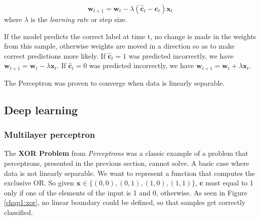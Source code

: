 \documentclass[11pt,english,listoffigures,listoftables]{tfgetsinf}
\newcommand{\vect}[1]{\mathbf{#1}}
\begin{document}
\begin{equation}
    \vect{w}_{t+1}=\vect{w}_t - \lambda(\vect{\hat{c}}_t - \vect{c}_t)\vect{x}_t
\end{equation}
where $\lambda$ is the \textit{learning rate} or step size.

If the model predicts the correct label at time t, no change is made in the weights from this sample, otherwise weights are moved in a direction so as to make correct predictions more likely.
If $\vect{\hat{c}}_t=1$ was predicted incorrectly, we have $\vect{w}_{t+1}=\vect{w}_t - \lambda \vect{x}_t$. 
If $\vect{\hat{c}}_t=0$ was predicted incorrectly, we have $\vect{w}_{t+1}=\vect{w}_t + \lambda \vect{x}_t$. 

The Perceptron was proven to converge when data is linearly separable.



\subsection{Deep learning}\label{dl}



\subsubsection{Multilayer perceptron}
The \textbf{XOR Problem} from \textit{Perceptrons} \cite{minsky69perceptrons}  was a classic example of a problem that perceptrons, presented in the previous section, cannot solve. A basic case where data is not linearly separable.
We want to represent a function that computes the exclusive OR. So given $\vect{x} \in \{(0,0), (0,1), (1,0), (1,1) \}$, $\vect{c}$ must equal to 1 only if one of the elements of the input is 1 and 0, otherwise. As seen in Figure \ref{chap1:xor}, no linear boundary could be defined, so that samples get correctly classified.
\end{document}
